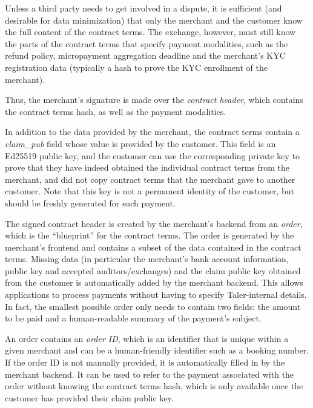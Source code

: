 Unless a third party needs to get involved in a dispute, it is sufficient (and
desirable for data minimization) that only the merchant and the customer know
the full content of the contract terms.  The exchange, however,  must still
know the parts of the contract terms that specify payment modalities, such as
the refund policy, micropayment aggregation deadline and the merchant's KYC
registration data (typically a hash to prove the KYC enrollment of the
merchant).

Thus, the merchant's signature is made over the \emph{contract header},
which contains the contract terms hash, as well as the payment modalities.

In addition to the data provided by the merchant, the contract terms contain a
\emph{claim\_pub} field whose value is provided by the customer.
This field is an Ed25519 public key, and the customer can use the corresponding
private key to prove that they have indeed obtained the individual contract
terms from the merchant, and did not copy contract terms that the merchant gave
to another customer.  Note that this key is not a permanent identity of the
customer, but should be freshly generated for each payment.

The signed contract header is created by the merchant's backend from an
\emph{order}, which is the ``blueprint'' for the contract terms.  The order is
generated by the merchant's frontend and contains a subset of the data
contained in the contract terms.  Missing data (in particular the merchant's
bank account information, public key and accepted auditors/exchanges) and
the claim public key obtained from the customer is automatically added by the merchant
backend.  This allows applications to process payments without having to
specify Taler-internal details.  In fact, the smallest possible order only
needs to contain two fields:  the amount to be paid and a human-readable
summary of the payment's subject.

An order contains an \emph{order ID}, which is an identifier that is unique
within a given merchant and can be a human-friendly identifier such as a
booking number.  If the order ID is not manually provided, it is automatically
filled in by the merchant backend.  It can be used to refer to the payment
associated with the order without knowing the contract terms hash, which is
only available once the customer has provided their claim public key.

